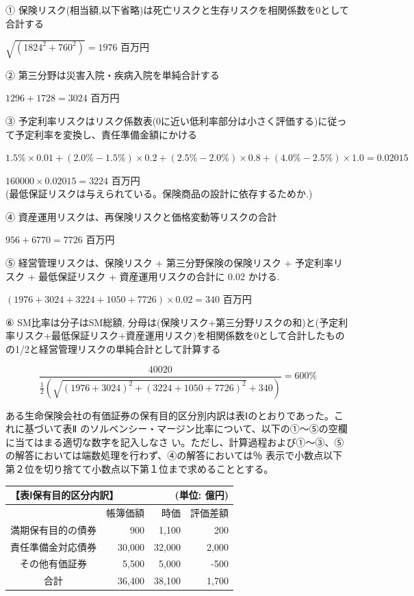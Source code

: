 \documentclass[report,gutter=10mm,fore-edge=10mm,uplatex,dvipdfmx]{jlreq}
\begin{document}
\answer{}
①  保険リスク(相当額,以下省略)は死亡リスクと生存リスクを相関係数を0として合計する\par
$\sqrt{(1824^2+760^2)}=1976$ 百万円 

② 第三分野は災害入院・疾病入院を単純合計する\par
$1296+1728=3024$ 百万円 

③ 予定利率リスクはリスク係数表(0に近い低利率部分は小さく評価する)に従って予定利率を変換し、責任準備金額にかける\par
$1.5\%\times 0.01+(2.0\% -1.5\%)\times 0.2+(2.5\% - 2.0\%)\times 0.8+(4.0\%-2.5\%)\times 1.0 = 0.02015$\par
$160000\times 0.02015=3224$ 百万円 
\\[1zh]
(最低保証リスクは与えられている。保険商品の設計に依存するためか.)

④ 資産運用リスクは、再保険リスクと価格変動等リスクの合計\par
$956+6770=7726$ 百万円 

⑤ 経営管理リスクは、保険リスク + 第三分野保険の保険リスク + 予定利率リスク + 最低保証リスク + 資産運用リスクの合計に 0.02 かける.\par
$(1976+3024+3224+1050+7726)\times 0.02 = 340$ 百万円 

⑥ SM比率は分子はSM総額, 分母は(保険リスク+第三分野リスクの和)と(予定利率リスク+最低保証リスク+資産運用リスク)を相関係数を0として合計したものの1/2と経営管理リスクの単純合計として計算する\par
$$
\frac{40020}{\frac{1}{2}(\sqrt{(1976+3024)^2+(3224+1050+7726)^2}+340)}=600\%
$$


ある生命保険会社の有価証券の保有目的区分別内訳は表Ⅰのとおりであった。これに基づいて表Ⅱ
のソルベンシー・マージン比率について、以下の①〜⑤の空欄に当てはまる適切な数字を記入しなさ
い。ただし、計算過程および①〜③、⑤の解答においては端数処理を行わず、④の解答においては％
表示で小数点以下第２位を切り捨てて小数点以下第１位まで求めることとする。

\begin{tabular}{|c|r|r|r|}
 \multicolumn{2}{l}{【表Ⅰ保有目的区分内訳】}  & \multicolumn{2}{r}{ (単位: 億円)}\\ \hline
 &帳簿価額&時価&評価差額\\ \hline
満期保有目的の債券& 900 & 1,100& 200\\ \hline
責任準備金対応債券& 30,000 & 32,000& 2,000\\ \hline
その他有価証券& 5,500 & 5,000& -500\\ \hline
合計 & 36,400 & 38,100& 1,700\\ \hline
\end{tabular}
\end{document}
